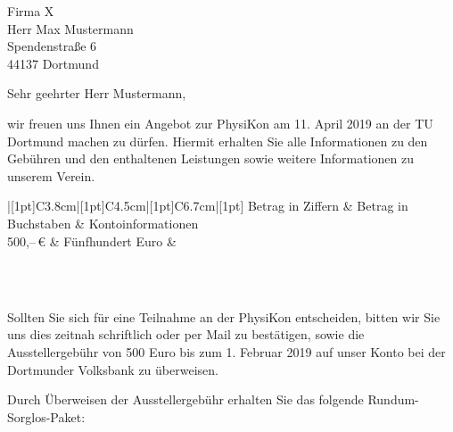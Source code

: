 \documentclass[
  pepbrief,
  fontsize=12pt,
  paper=a4,
  DIV=14,
  parskip=half,
  backaddress=false,
]{scrlttr2}
\author{Lena Linhoff}
\begin{document}
\begin{letter}{%
  Firma X\\
  Herr Max Mustermann\\
  Spendenstraße 6\\
  44137 Dortmund%
}
\opening{Sehr geehrter Herr Mustermann,}
wir freuen uns Ihnen ein Angebot zur PhysiKon am 11. April 2019 an der TU Dortmund machen zu dürfen. 
Hiermit erhalten Sie alle Informationen zu den Gebühren und den enthaltenen Leistungen sowie weitere Informationen zu unserem Verein.

\renewcommand{\arraystretch}{1.2}
\begin{center}
  \bfseries\scshape
	\begin{tabu}{|[1pt]C{3.8cm}|[1pt]C{4.5cm}|[1pt]C{6.7cm}|[1pt]}
		\tabucline[1pt]{-}
		 Betrag in Ziffern	&	Betrag in Buchstaben & Kontoinformationen\\
		\tabucline[1pt]{-}
    500,–\,€ & \normalfont Fünfhundert Euro & \normalfont \begin{tabular}{@{}c@{}}\end{tabular}\\
		\tabucline[1pt]{-}
	\end{tabu}
\end{center}
Sollten Sie sich für eine Teilnahme an der PhysiKon entscheiden, bitten wir Sie uns dies zeitnah schriftlich oder per Mail zu bestätigen, sowie die Ausstellergebühr von 500 Euro bis zum 1. Februar 2019 auf unser Konto bei der Dortmunder Volksbank zu überweisen.

Durch Überweisen der Ausstellergebühr erhalten Sie das folgende Rundum-Sorglos-Paket:


\end{letter}
\end{document}
